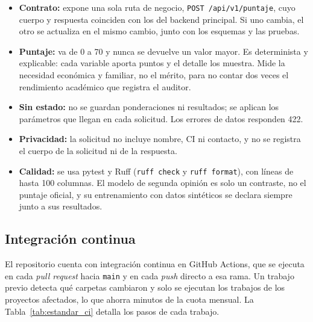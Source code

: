 \begin{itemize}
    \item \textbf{Contrato:} expone una sola ruta de negocio, \texttt{POST /api/v1/puntaje}, cuyo cuerpo y respuesta coinciden con los del backend principal. Si uno cambia, el otro se actualiza en el mismo cambio, junto con los esquemas y las pruebas.
    \item \textbf{Puntaje:} va de 0 a 70 y nunca se devuelve un valor mayor. Es determinista y explicable: cada variable aporta puntos y el detalle los muestra. Mide la necesidad económica y familiar, no el mérito, para no contar dos veces el rendimiento académico que registra el auditor.
    \item \textbf{Sin estado:} no se guardan ponderaciones ni resultados; se aplican los parámetros que llegan en cada solicitud. Los errores de datos responden 422.
    \item \textbf{Privacidad:} la solicitud no incluye nombre, CI ni contacto, y no se registra el cuerpo de la solicitud ni de la respuesta.
    \item \textbf{Calidad:} se usa pytest y Ruff (\texttt{ruff check} y \texttt{ruff format}), con líneas de hasta 100 columnas. El modelo de segunda opinión es solo un contraste, no el puntaje oficial, y su entrenamiento con datos sintéticos se declara siempre junto a sus resultados.
\end{itemize}

\subsection{Integración continua}

El repositorio cuenta con integración continua en GitHub Actions, que se ejecuta en cada \textit{pull request} hacia \texttt{main} y en cada \textit{push} directo a esa rama. Un trabajo previo detecta qué carpetas cambiaron y solo se ejecutan los trabajos de los proyectos afectados, lo que ahorra minutos de la cuota mensual. La Tabla~\ref{tab:estandar_ci} detalla los pasos de cada trabajo.

